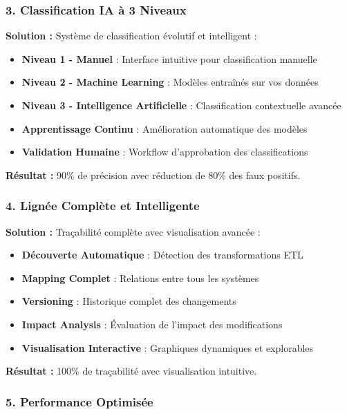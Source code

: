 \documentclass[12pt,a4paper]{article}
\begin{document}
\subsubsection{3. Classification IA à 3 Niveaux}

\textbf{Solution :} Système de classification évolutif et intelligent :

\begin{itemize}
    \item \textbf{Niveau 1 - Manuel} : Interface intuitive pour classification manuelle
    \item \textbf{Niveau 2 - Machine Learning} : Modèles entraînés sur vos données
    \item \textbf{Niveau 3 - Intelligence Artificielle} : Classification contextuelle avancée
    \item \textbf{Apprentissage Continu} : Amélioration automatique des modèles
    \item \textbf{Validation Humaine} : Workflow d'approbation des classifications
\end{itemize}

\textbf{Résultat :} 90\% de précision avec réduction de 80\% des faux positifs.

\subsubsection{4. Lignée Complète et Intelligente}

\textbf{Solution :} Traçabilité complète avec visualisation avancée :

\begin{itemize}
    \item \textbf{Découverte Automatique} : Détection des transformations ETL
    \item \textbf{Mapping Complet} : Relations entre tous les systèmes
    \item \textbf{Versioning} : Historique complet des changements
    \item \textbf{Impact Analysis} : Évaluation de l'impact des modifications
    \item \textbf{Visualisation Interactive} : Graphiques dynamiques et explorables
\end{itemize}

\textbf{Résultat :} 100\% de traçabilité avec visualisation intuitive.

\subsubsection{5. Performance Optimisée}
\end{document}
